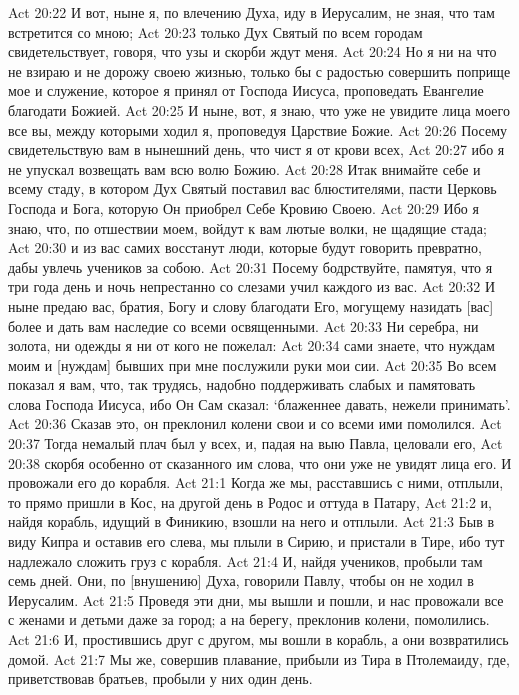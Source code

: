 Act 20:22  И вот, ныне я, по влечению Духа, иду в Иерусалим, не зная, что там встретится со мною;
Act 20:23  только Дух Святый по всем городам свидетельствует, говоря, что узы и скорби ждут меня.
Act 20:24  Но я ни на что не взираю и не дорожу своею жизнью, только бы с радостью совершить поприще мое и служение, которое я принял от Господа Иисуса, проповедать Евангелие благодати Божией.
Act 20:25  И ныне, вот, я знаю, что уже не увидите лица моего все вы, между которыми ходил я, проповедуя Царствие Божие.
Act 20:26  Посему свидетельствую вам в нынешний день, что чист я от крови всех,
Act 20:27  ибо я не упускал возвещать вам всю волю Божию.
Act 20:28  Итак внимайте себе и всему стаду, в котором Дух Святый поставил вас блюстителями, пасти Церковь Господа и Бога, которую Он приобрел Себе Кровию Своею.
Act 20:29  Ибо я знаю, что, по отшествии моем, войдут к вам лютые волки, не щадящие стада;
Act 20:30  и из вас самих восстанут люди, которые будут говорить превратно, дабы увлечь учеников за собою.
Act 20:31  Посему бодрствуйте, памятуя, что я три года день и ночь непрестанно со слезами учил каждого из вас.
Act 20:32  И ныне предаю вас, братия, Богу и слову благодати Его, могущему назидать [вас] более и дать вам наследие со всеми освященными.
Act 20:33  Ни серебра, ни золота, ни одежды я ни от кого не пожелал:
Act 20:34  сами знаете, что нуждам моим и [нуждам] бывших при мне послужили руки мои сии.
Act 20:35  Во всем показал я вам, что, так трудясь, надобно поддерживать слабых и памятовать слова Господа Иисуса, ибо Он Сам сказал: `блаженнее давать, нежели принимать'.
Act 20:36  Сказав это, он преклонил колени свои и со всеми ими помолился.
Act 20:37  Тогда немалый плач был у всех, и, падая на выю Павла, целовали его,
Act 20:38  скорбя особенно от сказанного им слова, что они уже не увидят лица его. И провожали его до корабля.
Act 21:1  Когда же мы, расставшись с ними, отплыли, то прямо пришли в Кос, на другой день в Родос и оттуда в Патару,
Act 21:2  и, найдя корабль, идущий в Финикию, взошли на него и отплыли.
Act 21:3  Быв в виду Кипра и оставив его слева, мы плыли в Сирию, и пристали в Тире, ибо тут надлежало сложить груз с корабля.
Act 21:4  И, найдя учеников, пробыли там семь дней. Они, по [внушению] Духа, говорили Павлу, чтобы он не ходил в Иерусалим.
Act 21:5  Проведя эти дни, мы вышли и пошли, и нас провожали все с женами и детьми даже за город; а на берегу, преклонив колени, помолились.
Act 21:6  И, простившись друг с другом, мы вошли в корабль, а они возвратились домой.
Act 21:7  Мы же, совершив плавание, прибыли из Тира в Птолемаиду, где, приветствовав братьев, пробыли у них один день.
